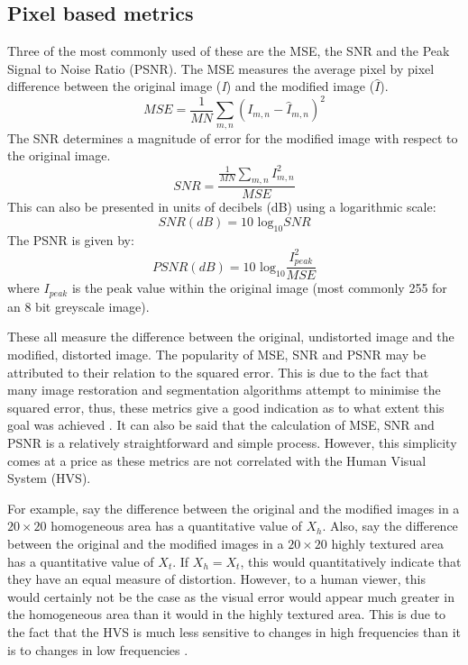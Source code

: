 \documentclass[12pt]{report}
\begin{document}
\subsection{Pixel based metrics}
\label{pixelMetrics}
Three of the most commonly used of these are the MSE, 
the SNR and the Peak Signal to Noise Ratio (PSNR).
The MSE measures the average pixel by pixel difference between the original image (\emph{I}) and
the modified image ($\hat{I}$).
\begin{equation}
	MSE = \frac{1}{MN} \sum_{m,n}(I_{m,n} - \hat{I}_{m,n})^{2}
\end{equation}
The SNR determines a magnitude of error for the modified image with respect to the original image.
\begin{equation}
	SNR = \frac {\frac{1}{MN} \sum_{m,n} I^{2}_{m,n}} {MSE}
\end{equation}
This can also be presented in units of decibels (dB) using a logarithmic scale:
\begin{equation}
	SNR(dB) = \mbox{10 log}_{10} SNR
\end{equation}
The PSNR is given by:
\begin{equation}
	PSNR(dB) = \mbox{10 log}_{10} \frac{I^{2}_{peak}}{MSE}
\end{equation}
where $I_{peak}$ is the peak value within the original image (most commonly 255 for an 8 bit 
greyscale image).

These all measure the difference between the original, undistorted image and the modified, distorted image.
The popularity of MSE, SNR and PSNR may be attributed to their relation to the squared error. 
This is due to the fact that many image restoration and segmentation algorithms attempt to minimise the squared error, thus, 
these metrics give a good indication
as to what extent this goal was achieved \cite{volo2nd}.
It can also be said that the calculation of MSE, SNR and PSNR is a relatively straightforward and simple process.
However, this simplicity comes
at a price as these metrics are not correlated with the Human Visual System (HVS). 

For example, say the difference between the original and the modified images in a $20 \times 20$ 
homogeneous area has
a quantitative value of $X_{h}$. 
Also, say the difference between the original and the modified images in a $20 \times 20$ 
highly textured area has a quantitative value of $X_{t}$. If $X_{h} = X_{t}$, this would quantitatively indicate that
they have an equal measure of distortion. However, to a human viewer, this would certainly not be the case as the visual error would
appear much greater in the homogeneous area than it would in the highly textured area. 
This is due to the fact that the HVS is much less sensitive
to changes in high frequencies than it is to changes in low frequencies \cite{kutterPHD}. 
\end{document}
